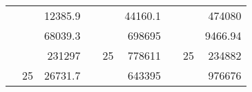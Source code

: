 \begin{table}[H]
\begin{tabular}{|ccrccrccc}
\rowcolor[HTML]{DAE8FC} 
\multicolumn{1}{|c|}{\cellcolor[HTML]{FFFFC7}}                                & \multicolumn{1}{c|}{\cellcolor[HTML]{DAE8FC}}                      & \multicolumn{1}{r|}{\cellcolor[HTML]{DAE8FC}12385.9}   & \multicolumn{1}{c|}{\cellcolor[HTML]{FFFFC7}}                                & \multicolumn{1}{c|}{\cellcolor[HTML]{DAE8FC}}                       & \multicolumn{1}{r|}{\cellcolor[HTML]{DAE8FC}44160.1}   & \multicolumn{1}{c|}{\cellcolor[HTML]{FFFFC7}}                                & \multicolumn{1}{c|}{\cellcolor[HTML]{DAE8FC}}                      & \multicolumn{1}{r|}{\cellcolor[HTML]{DAE8FC}474080}    \\ \cline{3-3} \cline{6-6} \cline{9-9} 
\multicolumn{1}{|c|}{\cellcolor[HTML]{FFFFC7}}                                & \multicolumn{1}{c|}{\cellcolor[HTML]{DAE8FC}}                      & \multicolumn{1}{r|}{\cellcolor[HTML]{DDFDFF}68039.3}   & \multicolumn{1}{c|}{\cellcolor[HTML]{FFFFC7}}                                & \multicolumn{1}{c|}{\cellcolor[HTML]{DAE8FC}}                       & \multicolumn{1}{r|}{\cellcolor[HTML]{DDFDFF}698695}    & \multicolumn{1}{c|}{\cellcolor[HTML]{FFFFC7}}                                & \multicolumn{1}{c|}{\cellcolor[HTML]{DAE8FC}}                      & \multicolumn{1}{r|}{\cellcolor[HTML]{DDFDFF}9466.94}   \\ \cline{3-3} \cline{6-6} \cline{9-9} 
\rowcolor[HTML]{DAE8FC} 
\multicolumn{1}{|c|}{\cellcolor[HTML]{FFFFC7}}                                & \multicolumn{1}{c|}{\cellcolor[HTML]{DAE8FC}}                      & \multicolumn{1}{r|}{\cellcolor[HTML]{DAE8FC}231297}    & \multicolumn{1}{c|}{\cellcolor[HTML]{FFFFC7}}                                & \multicolumn{1}{c|}{\multirow{-9}{*}{\cellcolor[HTML]{DAE8FC}25}}   & \multicolumn{1}{r|}{\cellcolor[HTML]{DAE8FC}778611}    & \multicolumn{1}{c|}{\cellcolor[HTML]{FFFFC7}}                                & \multicolumn{1}{c|}{\multirow{-9}{*}{\cellcolor[HTML]{DAE8FC}25}}  & \multicolumn{1}{r|}{\cellcolor[HTML]{DAE8FC}234882}    \\ \cline{3-3} \cline{5-6} \cline{8-9} 
\multicolumn{1}{|c|}{\cellcolor[HTML]{FFFFC7}}                                & \multicolumn{1}{c|}{\multirow{-10}{*}{\cellcolor[HTML]{DAE8FC}25}} & \multicolumn{1}{r|}{\cellcolor[HTML]{DDFDFF}26731.7}   & \multicolumn{1}{c|}{\cellcolor[HTML]{FFFFC7}}                                & \multicolumn{1}{c|}{\cellcolor[HTML]{DDFDFF}}                       & \multicolumn{1}{r|}{\cellcolor[HTML]{DAE8FC}643395}    & \multicolumn{1}{c|}{\cellcolor[HTML]{FFFFC7}}                                & \multicolumn{1}{c|}{\cellcolor[HTML]{DDFDFF}}                      & \multicolumn{1}{r|}{\cellcolor[HTML]{DAE8FC}976676}    \\ \cline{2-3} \cline{6-6} \cline{9-9} 

\end{tabular}
\end{table}
